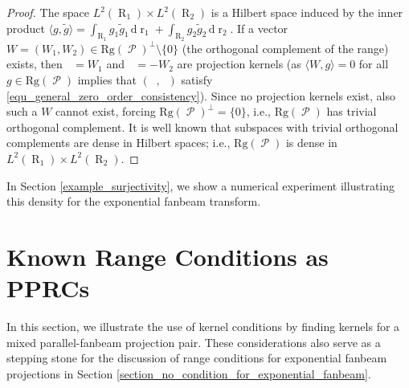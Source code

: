 \documentclass[12pt]{article}
\DeclareMathOperator{\Proj}{\mathcal{P}}
\newcommand{\dd}[1]{\,\mathrm{d}{#1}}
\newcommand{\rg}[1]{\mathrm{Rg}({#1})}
\DeclareMathOperator{\rayvariable}{r}
\DeclareMathOperator{\raygroundset}{R}
\DeclareMathOperator{\Vone}{V_1}
\DeclareMathOperator{\Vtwo}{V_2}
\begin{document}
\begin{proof}
The space $L^2(\raygroundset_1)\times L^2(\raygroundset_2)$ is a Hilbert space induced by the inner product $\langle g,\tilde g\rangle = \int_{\raygroundset_1} g_1\tilde g_1 \dd {\rayvariable_1}+\int_{\raygroundset_2} g_2\tilde g_2 \dd {\rayvariable_2}$. If a vector $W=(W_1,W_2)\in \rg{\Proj}^\perp\setminus \{0\}$ (the orthogonal complement of the range) exists, then $\Vone=W_1$ and $\Vtwo=-W_2$ are projection kernels (as $\langle W,g \rangle =0$ for all $g\in \rg{\Proj}$ implies that $(\Vone,\Vtwo)$ satisfy \eqref{equ_general_zero_order_consistency}). Since no projection kernels exist, also such a $W$ cannot exist, forcing $\rg{\Proj}^\perp=\{0\}$, i.e., $\rg{\Proj}$ has trivial orthogonal complement. It is well known that subspaces with trivial orthogonal complements are dense in Hilbert spaces; i.e., $\rg{\Proj}$ is dense in $L^2(\raygroundset_1)\times L^2(\raygroundset_2)$.
\end{proof}


 In Section \ref{example_surjectivity}, we show a numerical experiment illustrating this density for the exponential fanbeam transform.

\section{Known Range Conditions as PPRCs}
\label{section_recover_known_conditions}




In this section, we illustrate the use of kernel conditions by finding kernels for a mixed parallel-fanbeam projection pair.  These considerations also serve as a stepping stone for the discussion of range conditions for exponential fanbeam projections in Section \ref{section_no_condition_for_exponential_fanbeam}.
\end{document}
